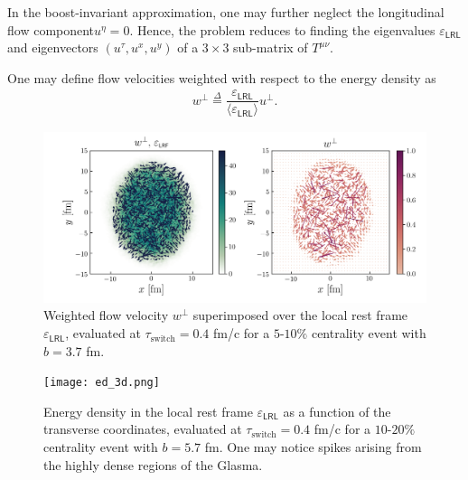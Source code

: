 In the boost-invariant approximation, one may further neglect the longitudinal flow component$u^\eta=0$. Hence, the problem reduces to finding the eigenvalues $\varepsilon_\textsf{LRL}$ and eigenvectors $(u^\tau, u^x, u^y)$ of a $3\times 3$ sub-matrix of $T^{\mu\nu}$. 

One may define flow velocities weighted with respect to the energy density as
\begin{align*}
    w^\perp\overset{\Delta}{=}\dfrac{\varepsilon_\textsf{LRL}}{\langle\varepsilon_\textsf{LRL}\rangle}u^\perp.
\end{align*}

\vspace{-0.5cm}

\begin{figure}[h!]
	\includegraphics{images/ed_u_auau_200_dpi_300.png}
	\caption{\normalsize Weighted flow velocity $w^\perp$ superimposed over the local rest frame $\varepsilon_\textsf{LRL}$, evaluated at $\tau_\mathrm{switch}=0.4$ fm/c for a $5$-$10\%$ centrality event with $b=3.7$ fm.}
\end{figure}

\begin{figure}[!hbt]
	\texttt{[image: ed\_3d.png]}
	\caption{\normalsize Energy density in the local rest frame $\varepsilon_\textsf{LRL}$ as a function of the transverse coordinates, evaluated at $\tau_\mathrm{switch}=0.4$ fm/c for a $10$-$20\%$ centrality event with $b=5.7$ fm. One may notice spikes arising from the highly dense regions of the Glasma.} 
\end{figure}

